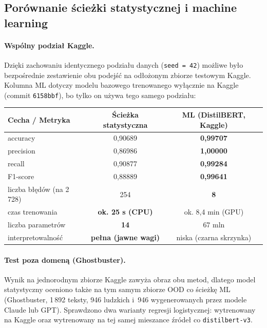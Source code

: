 \subsection{Porównanie ścieżki statystycznej i machine learning}

\paragraph{Wspólny podział Kaggle.}
Dzięki zachowaniu identycznego podziału danych (\texttt{seed = 42}) możliwe
było bezpośrednie zestawienie obu podejść na odłożonym zbiorze testowym Kaggle.
Kolumna ML dotyczy modelu bazowego trenowanego wyłącznie na Kaggle
(commit \texttt{6158bbf}), bo tylko on używa tego samego podziału:

\begin{center}
\begin{tabular}{|l|c|c|}
\hline
Cecha / Metryka & Ścieżka statystyczna & ML (DistilBERT, Kaggle) \\
\hline
accuracy & 0,90689 & \textbf{0,99707} \\
precision & 0,86986 & \textbf{1,00000} \\
recall & 0,90877 & \textbf{0,99284} \\
F1-score & 0,88889 & \textbf{0,99641} \\
liczba błędów (na 2\,728) & 254 & \textbf{8} \\
czas trenowania & \textbf{ok. 25 s (CPU)} & ok. 8,4 min (GPU) \\
liczba parametrów & \textbf{14} & 67 mln \\
interpretowalność & \textbf{pełna (jawne wagi)} & niska (czarna skrzynka) \\
\hline
\end{tabular}
\end{center}

\paragraph{Test poza domeną (Ghostbuster).}
Wynik na jednorodnym zbiorze Kaggle zawyża obraz obu metod, dlatego model
statystyczny oceniono także na tym samym zbiorze OOD co ścieżkę ML
(Ghostbuster, 1\,892 teksty, 946 ludzkich i~946 wygenerowanych przez modele Claude lub GPT).
Sprawdzono dwa warianty regresji logistycznej: wytrenowany na Kaggle oraz
wytrenowany na tej samej mieszance źródeł co \texttt{distilbert-v3}.

